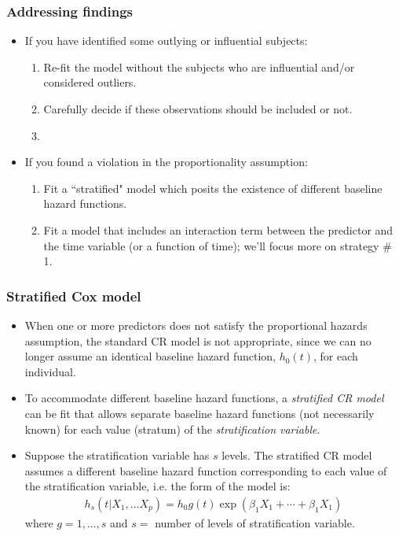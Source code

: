 \begin{frame}
\frametitle{Addressing findings}
\begin{itemize}
\item If you have identified some outlying or influential subjects:
\begin{enumerate}
\item Re-fit the model without the subjects who are influential and/or considered outliers.
\item Carefully decide if these observations should be included or not.
\item[]
\end{enumerate}
\item If you found a violation in the proportionality assumption:
\begin{enumerate}
\item Fit a ``stratified" model which posits the existence of different baseline hazard functions.
\item Fit a model that includes an interaction term between the predictor and the time variable (or a function of time); we'll focus more on strategy \# 1.
\end{enumerate}
\end{itemize}
\end{frame}


\begin{frame}
\frametitle{Stratified Cox model}
\begin{itemize}
\item When one or more predictors does not satisfy the proportional hazards assumption, the standard CR model is not appropriate, since we can no longer assume an identical baseline hazard function, $h_0(t)$, for each individual.
\item To accommodate different baseline hazard functions, a \emph{stratified CR model} can be fit that allows separate baseline hazard functions (not necessarily known) for each value (stratum) of the \textit{stratification variable}.
\item Suppose the stratification variable has $s$ levels. The stratified CR model assumes a different baseline hazard function corresponding to each value of the stratification variable, i.e. the form of the model is:
\begin{eqnarray}
h_s(t|X_1,...X_p) = h_0g(t)\exp(\beta_1X_1+\cdots+\beta_1X_1) \nonumber
\end{eqnarray}
where $g=1,\ldots,s$ and $s=$ number of levels of stratification variable.
\end{itemize}
\end{frame}

